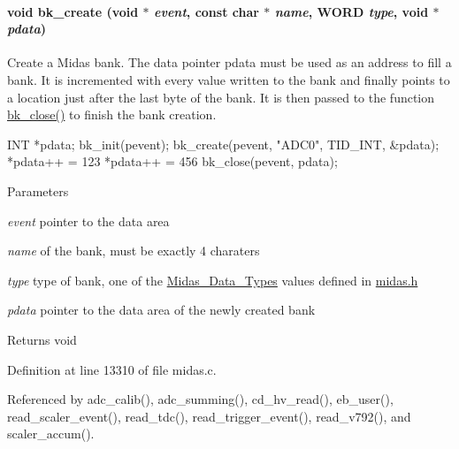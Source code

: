 \paragraph[{bk\_\-create}]{\setlength{\rightskip}{0pt plus 5cm}void bk\_\-create (void $\ast$ {\em event}, \/  const char $\ast$ {\em name}, \/  {\bf WORD} {\em type}, \/  void $\ast$ {\em pdata})}\hfill\label{group__bkfunctionc_ga4bb781187e18834136ed8ac368d53413}
Create a Midas bank. The data pointer pdata must be used as an address to fill a bank. It is incremented with every value written to the bank and finally points to a location just after the last byte of the bank. It is then passed to the function \hyperlink{group__bkfunctionc_ga132dc71c8f74b478cdcc59bc1d9f6a26}{bk\_\-close()} to finish the bank creation. 
\begin{DoxyCode}
INT *pdata;
bk_init(pevent);
bk_create(pevent, "ADC0", TID_INT, &pdata);
*pdata++ = 123
*pdata++ = 456
bk_close(pevent, pdata);
\end{DoxyCode}
 
\begin{DoxyParams}{Parameters}
\item[{\em event}]pointer to the data area \item[{\em name}]of the bank, must be exactly 4 charaters \item[{\em type}]type of bank, one of the \hyperlink{F_Midas_Code_and_Libraries_Midas_Data_Types}{Midas\_\-Data\_\-Types} values defined in \hyperlink{midas_8h}{midas.h} \item[{\em pdata}]pointer to the data area of the newly created bank \end{DoxyParams}
\begin{DoxyReturn}{Returns}
void 
\end{DoxyReturn}


Definition at line 13310 of file midas.c.

Referenced by adc\_\-calib(), adc\_\-summing(), cd\_\-hv\_\-read(), eb\_\-user(), read\_\-scaler\_\-event(), read\_\-tdc(), read\_\-trigger\_\-event(), read\_\-v792(), and scaler\_\-accum().
